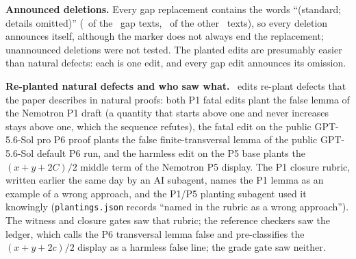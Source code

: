 \textbf{Announced deletions.} Every gap replacement contains the words ``(standard; details omitted)'' (\CRGapMarker\ of the \CRNPerClass\ gap texts, \CRGapMarkerOther\ of the other \CRNNonGap\ texts), so every deletion announces itself, although the marker does not always end the replacement; unannounced deletions were not tested. The planted edits are presumably easier than natural defects: each is one edit, and every gap edit announces its omission.

\textbf{Re-planted natural defects and who saw what.} \CRReplantAll\ edits re-plant defects that the paper describes in natural proofs: both P1 fatal edits plant the false lemma of the Nemotron P1 draft (a quantity that starts above one and never increases stays above one, which the sequence  refutes), the fatal edit on the public GPT-5.6-Sol pro P6 proof plants the false finite-transversal lemma of the public GPT-5.6-Sol default P6 run, and the harmless edit on the P5 base plants the $(x+y+2C)/2$ middle term of the Nemotron P5 display. The P1 closure rubric, written earlier the same day by an AI subagent, names the P1 lemma as an example of a wrong approach, and the P1/P5 planting subagent used it knowingly (\texttt{plantings.json} records ``named in the rubric as a wrong approach''). The witness and closure gates saw that rubric; the reference checkers saw the ledger, which calls the P6 transversal lemma false and pre-classifies the $(x+y+2c)/2$ display as a harmless false line; the grade gate saw neither.

